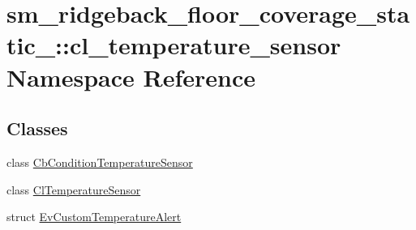 \hypertarget{namespacesm__ridgeback__floor__coverage__static__1_1_1cl__temperature__sensor}{}\section{sm\+\_\+ridgeback\+\_\+floor\+\_\+coverage\+\_\+static\+\_\+:\+:cl\+\_\+temperature\+\_\+sensor Namespace Reference}
\label{namespacesm__ridgeback__floor__coverage__static__1_1_1cl__temperature__sensor}
\subsection*{Classes}
\begin{DoxyCompactItemize}
\item 
class \hyperlink{classsm__ridgeback__floor__coverage__static__1_1_1cl__temperature__sensor_1_1CbConditionTemperatureSensor}{Cb\+Condition\+Temperature\+Sensor}
\item 
class \hyperlink{classsm__ridgeback__floor__coverage__static__1_1_1cl__temperature__sensor_1_1ClTemperatureSensor}{Cl\+Temperature\+Sensor}
\item 
struct \hyperlink{structsm__ridgeback__floor__coverage__static__1_1_1cl__temperature__sensor_1_1EvCustomTemperatureAlert}{Ev\+Custom\+Temperature\+Alert}
\end{DoxyCompactItemize}
